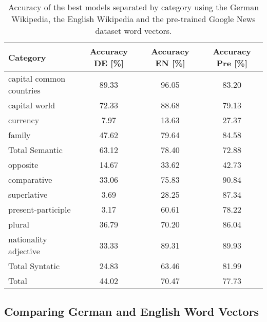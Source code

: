 \begin{table}[h]
\centering
\small
\caption{Accuracy of the best models separated by category using the German
  Wikipedia, the English Wikipedia and the pre-trained Google News dataset
  word vectors. } 
\label{tab:language_comparisson}


\small
\begin{tabular}{|l|c|c|c|}
\hline
 Category                  &  Accuracy DE [\%]  &  Accuracy EN [\%]  &  Accuracy Pre [\%]  \\
\hline
 capital common countries  &             89.33  &             96.05  &              83.20  \\
 capital world             &             72.33  &             88.68  &              79.13  \\
 currency                  &              7.97  &             13.63  &              27.37  \\
 family                    &             47.62  &             79.64  &              84.58  \\
\hline
 Total Semantic            &             63.12  &             78.40  &              72.88  \\
\hline
 opposite                  &             14.67  &             33.62  &              42.73  \\
 comparative               &             33.06  &             75.83  &              90.84  \\
 superlative               &              3.69  &             28.25  &              87.34  \\
 present-participle        &              3.17  &             60.61  &              78.22  \\
 plural                    &             36.79  &             70.20  &              86.04  \\
 nationality adjective     &             33.33  &             89.31  &              89.93  \\
\hline
 Total Syntatic            &             24.83  &             63.46  &              81.99  \\
\hline
 Total                     &             44.02  &             70.47  &              77.73  \\
\hline
\end{tabular}

\end{table}





\subsection{Comparing German and English Word Vectors}
\label{sec:sub:comparing_english_german_w2v}

